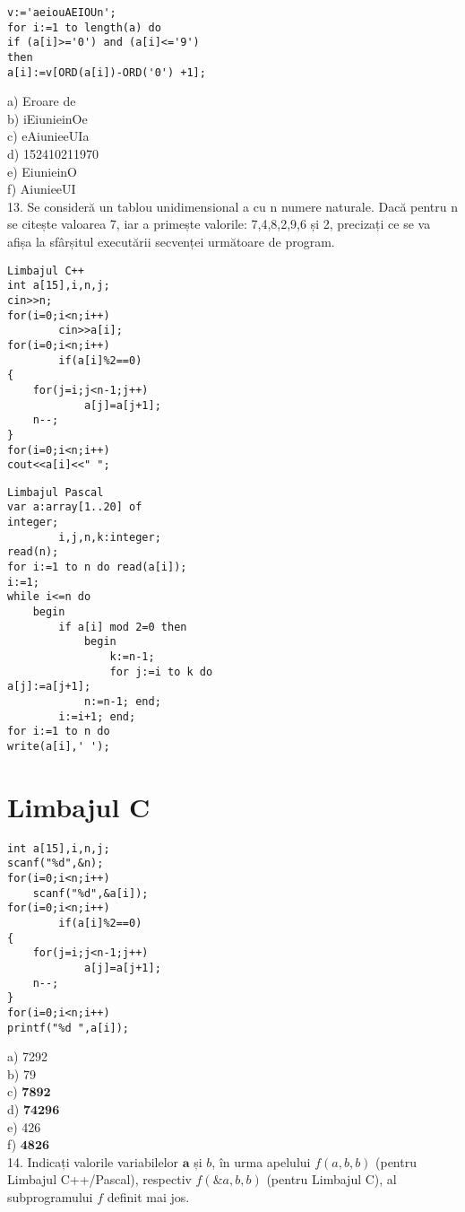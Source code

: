 \begin{verbatim}
v:='aeiouAEIOUn';
for i:=1 to length(a) do
if (a[i]>='0') and (a[i]<='9')
then
a[i]:=v[ORD(a[i])-ORD('0') +1];
\end{verbatim}

a) Eroare de\\
b) iEiunieinOe\\
c) eAiunieeUIa\\
d) 152410211970\\
e) EiunieinO\\
f) AiunieeUI\\
13. Se consideră un tablou unidimensional a cu n numere naturale. Dacă pentru n se citește valoarea 7, iar a primește valorile: 7,4,8,2,9,6 și 2, precizați ce se va afișa la sfârșitul executării secvenței următoare de program.

\begin{verbatim}
Limbajul C++
int a[15],i,n,j;
cin>>n;
for(i=0;i<n;i++)
        cin>>a[i];
for(i=0;i<n;i++)
        if(a[i]%2==0)
{
    for(j=i;j<n-1;j++)
            a[j]=a[j+1];
    n--;
}
for(i=0;i<n;i++)
cout<<a[i]<<" ";
\end{verbatim}

\begin{verbatim}
Limbajul Pascal
var a:array[1..20] of
integer;
        i,j,n,k:integer;
read(n);
for i:=1 to n do read(a[i]);
i:=1;
while i<=n do
    begin
        if a[i] mod 2=0 then
            begin
                k:=n-1;
                for j:=i to k do
a[j]:=a[j+1];
            n:=n-1; end;
        i:=i+1; end;
for i:=1 to n do
write(a[i],' ');
\end{verbatim}

\section*{Limbajul C}
\begin{verbatim}
int a[15],i,n,j;
scanf("%d",&n);
for(i=0;i<n;i++)
    scanf("%d",&a[i]);
for(i=0;i<n;i++)
        if(a[i]%2==0)
{
    for(j=i;j<n-1;j++)
            a[j]=a[j+1];
    n--;
}
for(i=0;i<n;i++)
printf("%d ",a[i]);
\end{verbatim}

a) 7292\\
b) 79\\
c) $\mathbf{7 8 9 2}$\\
d) $\mathbf{7 4 2 9 6}$\\
e) 426\\
f) $\mathbf{4 8 2 6}$\\
14. Indicați valorile variabilelor $\mathbf{a}$ și $b$, în urma apelului $f(a, b, b)$ (pentru Limbajul C++/Pascal), respectiv $f(\& a, b, b)$ (pentru Limbajul C), al subprogramului $f$ definit mai jos.

